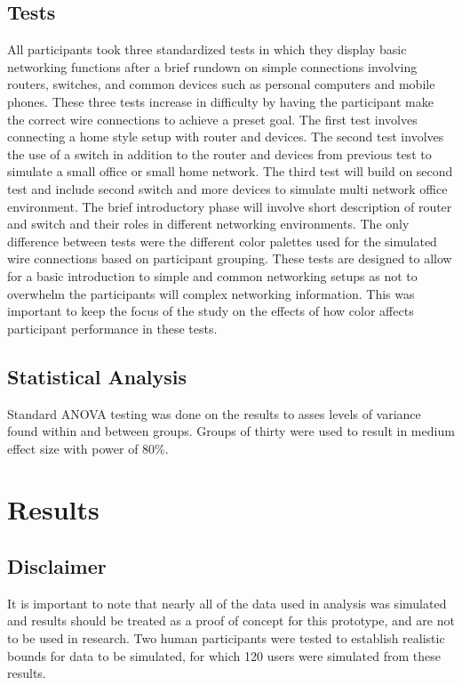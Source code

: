 \documentclass[acmlarge]{acmart}
\begin{document}
\subsection{Tests}
All participants took three standardized tests in which they display basic networking functions after a brief rundown on simple connections involving routers, switches, and common devices such as personal computers and mobile phones. These three tests increase in difficulty by having the participant make the correct wire connections to achieve a preset goal. The first test involves connecting a home style setup with router and devices. The second test involves the use of a switch in addition to the router and devices from previous test to simulate a small office or small home network. The third test will build on second test and include second switch and more devices to simulate multi network office environment. The brief introductory phase will involve short description of router and switch and their roles in different networking environments. The only difference between tests were the different color palettes used for the simulated wire connections based on participant grouping. These tests are designed to allow for a basic introduction to simple and common networking setups as not to overwhelm the participants will complex networking information. This was important to keep the focus of the study on the effects of how color affects participant performance in these tests.

\subsection{Statistical Analysis}
Standard ANOVA testing was done on the results to asses levels of variance found within and between groups. Groups of thirty were used to result in medium effect size with power of 80\%.

\section{Results}

\subsection{Disclaimer}
It is important to note that nearly all of the data used in analysis was simulated and results should be treated as a proof of concept for this prototype, and are not to be used in research. Two human participants were tested to establish realistic bounds for data to be simulated, for which 120 users were simulated from these results.
\end{document}
